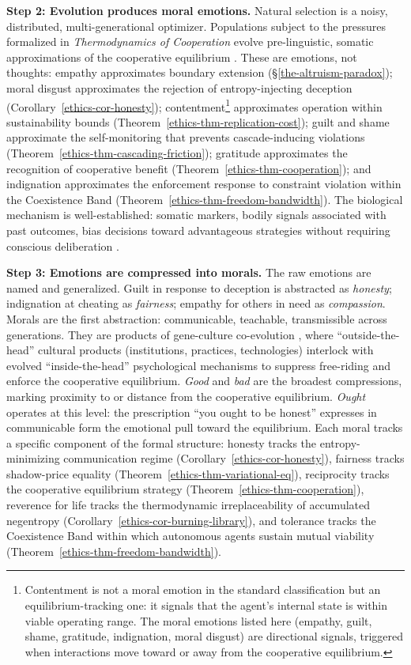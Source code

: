 \documentclass[11pt]{article}
\theoremstyle{plain}
\theoremstyle{definition}
\theoremstyle{remark}
\begin{document}
\textbf{Step 2: Evolution produces moral emotions.} Natural selection is
a noisy, distributed, multi-generational optimizer. Populations subject
to the pressures formalized in \emph{Thermodynamics of Cooperation}
evolve pre-linguistic, somatic approximations of the cooperative
equilibrium
\citep{Gigerenzer1999, GigerenzerGaissmaier2011, Frank1988, Gigerenzer2010}.
These are emotions, not thoughts: empathy approximates boundary
extension (§\ref{the-altruism-paradox}); moral disgust approximates the
rejection of entropy-injecting deception
(Corollary~\ref{ethics-cor-honesty}); contentment\footnote{Contentment
  is not a moral emotion in the standard classification
  \citep{Haidt2003} but an equilibrium-tracking one: it signals that the
  agent's internal state is within viable operating range. The moral
  emotions listed here (empathy, guilt, shame, gratitude, indignation,
  moral disgust) are directional signals, triggered when interactions
  move toward or away from the cooperative equilibrium.} approximates
operation within sustainability bounds
(Theorem~\ref{ethics-thm-replication-cost}); guilt and shame approximate
the self-monitoring that prevents cascade-inducing violations
(Theorem~\ref{ethics-thm-cascading-friction}); gratitude approximates
the recognition of cooperative benefit
(Theorem~\ref{ethics-thm-cooperation}); and indignation approximates the
enforcement response to constraint violation within the Coexistence Band
(Theorem~\ref{ethics-thm-freedom-bandwidth}). The biological mechanism
is well-established: somatic markers, bodily signals associated with
past outcomes, bias decisions toward advantageous strategies without
requiring conscious deliberation
\citep{Damasio1994, Bechara1997, BechaDamasio2005}.

\textbf{Step 3: Emotions are compressed into morals.} The raw emotions
are named and generalized. Guilt in response to deception is abstracted
as \emph{honesty}; indignation at cheating as \emph{fairness}; empathy
for others in need as \emph{compassion}. Morals are the first
abstraction: communicable, teachable, transmissible across generations.
They are products of gene-culture co-evolution
\citep{BoydRicherson1985, Henrich2015SOS}, where ``outside-the-head''
cultural products (institutions, practices, technologies) interlock with
evolved ``inside-the-head'' psychological mechanisms to suppress
free-riding \citep{Haidt2010} and enforce the cooperative equilibrium.
\emph{Good} and \emph{bad} are the broadest compressions, marking
proximity to or distance from the cooperative equilibrium. \emph{Ought}
operates at this level: the prescription ``you ought to be honest''
expresses in communicable form the emotional pull toward the
equilibrium. Each moral tracks a specific component of the formal
structure: honesty tracks the entropy-minimizing communication regime
(Corollary~\ref{ethics-cor-honesty}), fairness tracks shadow-price
equality (Theorem~\ref{ethics-thm-variational-eq}), reciprocity tracks
the cooperative equilibrium strategy
(Theorem~\ref{ethics-thm-cooperation}), reverence for life tracks the
thermodynamic irreplaceability of accumulated negentropy
(Corollary~\ref{ethics-cor-burning-library}), and tolerance tracks the
Coexistence Band within which autonomous agents sustain mutual viability
(Theorem~\ref{ethics-thm-freedom-bandwidth}).
\end{document}
